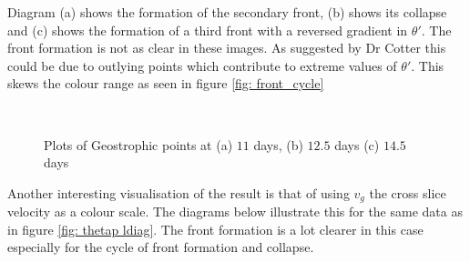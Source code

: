 Diagram (a) shows the formation of the secondary front, (b) shows its collapse and (c) shows the formation of a third front with a reversed gradient in $\theta '$. The front formation is not as clear in these images. As suggested by Dr Cotter this could be due to outlying points which contribute to extreme values of $\theta '$. This skews the colour range as seen in figure \ref{fig: front_cycle}

\begin{figure}[h]
	\centering
	\\
	\caption{Plots of Geostrophic points at (a) $11$ days, (b) $12.5$ days (c) $14.5$ days}
	\label{Gpoints_front}
\end{figure}

Another interesting visualisation of the result is that of using $v_g$ the cross slice velocity as a colour scale. The diagrams below illustrate this for the same data as in figure \ref{fig: thetap ldiag}. The front formation is a lot clearer in this case especially for the cycle of front formation and collapse.\\

